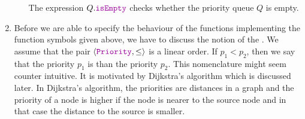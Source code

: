 \begin{Definition}
\begin{enumerate}
\begin{enumerate}
              The expression $Q.\mytt{isEmpty}$ checks whether the priority queue $Q$ is empty.
        \end{enumerate}
\item Before we are able to specify the behaviour of the functions implementing the function symbols
      given above, we have to discuss the notion of the .  We assume that the pair
      $\langle \mytt{Priority}, \leq \rangle$  is a linear order.
      If  $p_1 < p_2$, then we say that the priority $p_1$ is  than the priority $p_2$.  This
      nomenclature might seem counter intuitive.  It is motivated by 
      Dijkstra's algorithm which is discussed later.  In Dijkstra's algorithm, the priorities are
      distances in a graph and the priority of a node is higher if the node is nearer to the source
      node and in that case the distance to the source is smaller.


\end{enumerate}
\end{Definition}
